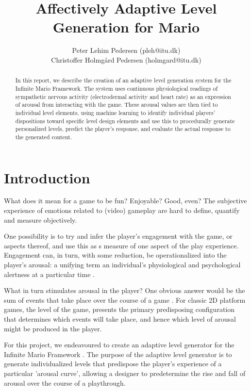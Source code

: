 \documentclass{llncs}
\begin{document}
\title{Affectively Adaptive Level Generation for Mario}
\author{Peter Lehim Pedersen (pleh@itu.dk) \\Christoffer Holmg{\aa}rd Pedersen (holmgard@itu.dk)}
\maketitle
\begin{abstract}
In this report, we describe the creation of an adaptive level generation system for the Infinite Mario Framework.
The system uses continuous physiological readings of sympathetic nervous activity (electrodermal activity and heart rate) as an expression of arousal from interacting with the game.
These arousal values are then tied to individual level elements, using machine learning to identify individual players' dispositions toward specific level design elements and use this to procedurally generate personalized levels, predict the player's response, and evaluate the actual response to the generated content.
\end{abstract}
\section{Introduction}
What does it mean for a game to be fun? Enjoyable? Good, even? The subjective experience of emotions related to (video) gameplay are hard to define, quantify and measure objectively.

One possibility is to try and infer the player's engagement with the game, or aspects thereof, and use this as s measure of one aspect of the play experience.
Engagement can, in turn, with some reduction, be operationalized into the player's arousal: a unifying term an individual's physiological and psychological alertness at a particular time \cite{picard1997affective}.

What in turn stimulates arousal in the player? One obvious answer would be the sum of events that take place over the course of a game \cite{ravaja2005psychophysiology}. For classic 2D platform games, the level of the game, %
presents the primary predisposing configuration that determines which events will take place, and hence which level of arousal might be produced in the player.%

For this project, we endeavoured to create an adaptive level generator for the Infinite Mario Framework \cite{marioai}. The purpose of the adaptive level generator is to generate individualized levels that predispose the player's experience of a particular 'arousal curve', allowing a designer to predetermine the rise and fall of arousal over the course of a playthrough.
\end{document}
